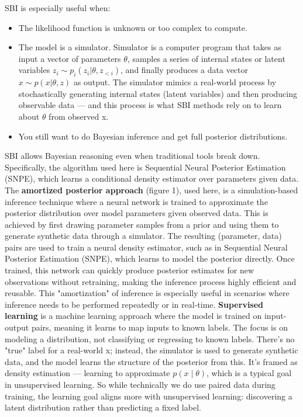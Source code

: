 \documentclass{article}
\begin{document}
SBI is especially useful when:
\begin{itemize}
    \item The likelihood function is unknown or too complex to compute.
    \item The model is a simulator. Simulator is a computer program that
    takes as input a vector of parameters $\theta$, samples a series of
    internal states or latent variables $z_i \sim p_i(z_i|\theta,z_{<i})$, and finally
    produces a data vector $x\sim p(x|\theta,z)$ as output. The simulator mimics a real-world process by stochastically generating internal states (latent variables) and then producing observable data — and this process is what SBI methods rely on to learn about $\theta$ from observed x.
    \item You still want to do Bayesian inference and get full posterior distributions.
\end{itemize}

SBI allows Bayesian reasoning even when traditional tools break down.
Specifically, the algorithm used here is Sequential Neural Posterior Estimation (SNPE), which learns a conditional density estimator over parameters given data.
The \textbf{amortized posterior approach} (figure 1), used here, is a simulation-based inference technique where a neural network is trained to approximate the posterior distribution over model parameters given observed data. This is achieved by first drawing parameter samples from a prior and using them to generate synthetic data through a simulator. The resulting (parameter, data) pairs are used to train a neural density estimator, such as in Sequential Neural Posterior Estimation (SNPE), which learns to model the posterior directly. Once trained, this network can quickly produce posterior estimates for new observations without retraining, making the inference process highly efficient and reusable. This "amortization" of inference is especially useful in scenarios where inference needs to be performed repeatedly or in real-time.
\textbf{Supervised learning} is a machine learning approach where the model is trained on input-output pairs, meaning it learns to map inputs to known labels.
The focus is on modeling a distribution, not classifying or regressing to known labels.
There's no "true" label for a real-world x; instead, the simulator is used to generate synthetic data, and the model learns the structure of the posterior from this.
It's framed as density estimation — learning to approximate $p(x \mid \theta)$, which is a typical goal in unsupervised learning.
So while technically we do use paired data during training, the learning goal aligns more with unsupervised learning: discovering a latent distribution rather than predicting a fixed label.
\end{document}
